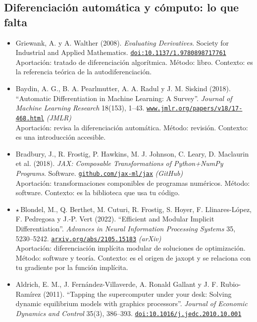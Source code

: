\documentclass[11pt]{article}
\begin{document}
\subsection*{Diferenciación automática y cómputo: lo que falta}
\begin{itemize}
\item Griewank, A. y A. Walther (2008). \textit{Evaluating Derivatives}. Society for Industrial and Applied Mathematics. \href{https://doi.org/10.1137/1.9780898717761}{\texttt{doi:10.1137/1.9780898717761}}\\
Aportación: tratado de diferenciación algorítmica. Método: libro. Contexto: es la referencia teórica de la autodiferenciación.
\item Baydin, A. G., B. A. Pearlmutter, A. A. Radul y J. M. Siskind (2018). ``Automatic Differentiation in Machine Learning: A Survey''. \textit{Journal of Machine Learning Research} 18(153), 1--43. \href{https://www.jmlr.org/papers/v18/17-468.html}{\texttt{www.jmlr.org/papers/v18/17-468.html}} \textit{(JMLR)}\\
Aportación: revisa la diferenciación automática. Método: revisión. Contexto: es una introducción accesible.
\item Bradbury, J., R. Frostig, P. Hawkins, M. J. Johnson, C. Leary, D. Maclaurin et al. (2018). \textit{JAX: Composable Transformations of Python+NumPy Programs}. Software. \href{https://github.com/jax-ml/jax}{\texttt{github.com/jax-ml/jax}} \textit{(GitHub)}\\
Aportación: transformaciones componibles de programas numéricos. Método: software. Contexto: es la biblioteca que usa tu código.
\item $\star$\,Blondel, M., Q. Berthet, M. Cuturi, R. Frostig, S. Hoyer, F. Llinares-López, F. Pedregosa y J.-P. Vert (2022). ``Efficient and Modular Implicit Differentiation''. \textit{Advances in Neural Information Processing Systems} 35, 5230--5242. \href{https://arxiv.org/abs/2105.15183}{\texttt{arxiv.org/abs/2105.15183}} \textit{(arXiv)}\\
Aportación: diferenciación implícita modular de soluciones de optimización. Método: software y teoría. Contexto: es el origen de jaxopt y se relaciona con tu gradiente por la función implícita.
\item Aldrich, E. M., J. Fernández-Villaverde, A. Ronald Gallant y J. F. Rubio-Ramírez (2011). ``Tapping the supercomputer under your desk: Solving dynamic equilibrium models with graphics processors''. \textit{Journal of Economic Dynamics and Control} 35(3), 386--393. \href{https://doi.org/10.1016/j.jedc.2010.10.001}{\texttt{doi:10.1016/j.jedc.2010.10.001}}\\

\end{itemize}
\end{document}
